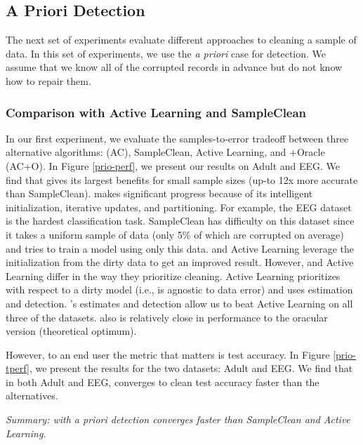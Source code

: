 \subsection{\sys A Priori Detection}
The next set of experiments evaluate different approaches to cleaning a sample of data.
In this set of experiments, we use the \emph{a priori} case for detection.
We assume that we know all of the corrupted records in advance but do not know how to repair them. 

\subsubsection{Comparison with Active Learning and SampleClean}
In our first experiment, we evaluate the samples-to-error tradeoff between three alternative algorithms: \sys (AC), SampleClean, Active Learning, and \sys+Oracle (AC+O).
In Figure \ref{prio-perf}, we present our results on Adult and EEG. 
We find that \sys gives its largest benefits for small sample sizes (up-to 12x more accurate than SampleClean).
\sys makes significant progress because of its intelligent initialization, iterative updates, and partitioning.
For example, the EEG dataset is the hardest classification task.
SampleClean has difficulty on this dataset since it takes a uniform sample of data (only 5\% of which are corrupted on average) and tries to train a model using only this data.
\sys and Active Learning leverage the initialization from the dirty data to get an improved result. 
However, \sys and Active Learning differ in the way they prioritize cleaning.
Active Learning prioritizes with respect to a dirty model (i.e., is agnostic to data error) and \sys uses estimation and detection.
\sys's estimates and detection allow us to beat Active Learning on all three of the datasets.
\sys also is relatively close in performance to the oracular version (theoretical optimum).

However, to an end user the metric that matters is test accuracy.
In Figure \ref{prio-tperf}, we present the results for the two datasets: Adult and EEG.
We find that in both Adult and EEG, \sys converges to clean test accuracy faster than the alternatives.

\vspace{0.25em}

\noindent \emph{Summary: \sys with a priori detection converges faster than SampleClean and Active Learning.}

